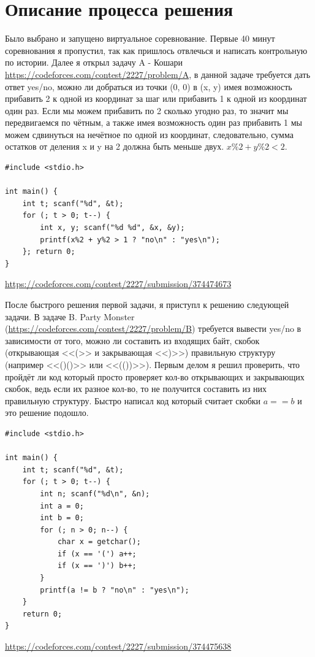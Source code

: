 \documentclass[oneside,a4paper,14pt]{extarticle} %
\begin{document}
  \section*{Описание процесса решения}
  Было выбрано и запущено виртуальное соревнование.
  Первые 40 минут соревнования я пропустил, так как пришлось отвлечься и написать контрольную по истории.
  Далее я открыл задачу A - Кошари \url{https://codeforces.com/contest/2227/problem/A},
  в данной задаче требуется дать ответ yes/no, можно ли добраться из точки (0, 0) в (x, y)
  имея возможность прибавить 2 к одной из координат за шаг или прибавить 1 к одной из координат один раз.
  Если мы можем прибавить по 2 сколько угодно раз, то значит мы передвигаемся по чётным,
  а также имея возможность один раз прибавить 1 мы можем сдвинуться на нечётное по одной из координат,
  следовательно, сумма остатков от деления x и y на 2 должна быть меньше двух. $x\%2 + y\%2 < 2$.

  \begin{lstlisting}[caption={Решение задачи A - Кошари}]
#include <stdio.h>

int main() {
	int t; scanf("%d", &t);
	for (; t > 0; t--) {
		int x, y; scanf("%d %d", &x, &y);
		printf(x%2 + y%2 > 1 ? "no\n" : "yes\n");
	}; return 0;
}
  \end{lstlisting}
  \url{https://codeforces.com/contest/2227/submission/374474673}
  \newpage

  После быстрого решения первой задачи, я приступл к решению следующей задачи.
  В задаче B. Party Monster (\url{https://codeforces.com/contest/2227/problem/B}) требуется вывести yes/no
  в зависимости от того, можно ли составить из входящих байт, скобок (открывающая <<(>> и закрывающая <<)>>)
  правильную структуру (например <<()()>> или <<(())>>). Первым делом я решил проверить, что пройдёт ли код
  который просто проверяет кол-во открывающих и закрывающих скобок, ведь если их разное кол-во, то не получится
  составить из них правильную структуру. Быстро написал код который считает скобки $a == b$ и это решение подошло.

  \begin{lstlisting}[caption={Решение задачи B. Party Monster}]
#include <stdio.h>

int main() {
	int t; scanf("%d", &t);
	for (; t > 0; t--) {
		int n; scanf("%d\n", &n);
		int a = 0;
		int b = 0;
		for (; n > 0; n--) {
			char x = getchar();
			if (x == '(') a++;
			if (x == ')') b++;
		}
		printf(a != b ? "no\n" : "yes\n");
	}
	return 0;
}
  \end{lstlisting}
  \url{https://codeforces.com/contest/2227/submission/374475638} \\
\end{document}

